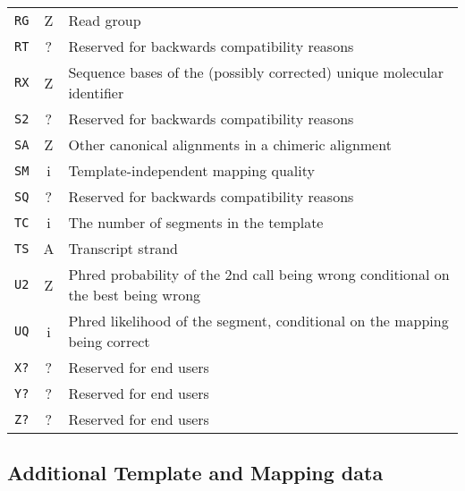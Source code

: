 \documentclass[10pt]{article}
\begin{document}
\begin{center}
\begin{longtable}{ccp{12.5cm}}
  {\tt RG} & Z & Read group \\
  {\tt RT} & ? & Reserved for backwards compatibility reasons \\
  {\tt RX} & Z & Sequence bases of the (possibly corrected) unique molecular identifier \\
  {\tt S2} & ? & Reserved for backwards compatibility reasons \\
  {\tt SA} & Z & Other canonical alignments in a chimeric alignment \\
  {\tt SM} & i & Template-independent mapping quality \\
  {\tt SQ} & ? & Reserved for backwards compatibility reasons \\
  {\tt TC} & i & The number of segments in the template \\
  {\tt TS} & A & Transcript strand \\
  {\tt U2} & Z & Phred probability of the 2nd call being wrong conditional on the best being wrong \\
  {\tt UQ} & i & Phred likelihood of the segment, conditional on the mapping being correct \\
  {\tt X?} & ? & Reserved for end users \\
  {\tt Y?} & ? & Reserved for end users \\
  {\tt Z?} & ? & Reserved for end users \\
  \hline
\end{longtable}
\end{center}

\subsection{Additional Template and Mapping data}
\end{document}
